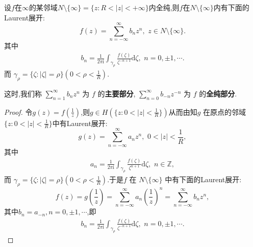 \documentclass[../../main.tex]{subfiles}%
\begin{document}
\begin{theorem}
设$f$在$\infty$的某邻域$N\setminus \{\infty\}=\{z:R<|z|<+\infty\}$内全纯,则\( f \)在$N\setminus \{\infty\}$内有下面的Laurent展开:
\[
f(z) = \sum_{n = -\infty}^{\infty} b_n z^n,\,\,z\in N\setminus \{\infty\}.
\]
其中
\begin{align*}
b_n=\frac{1}{2\pi \mathrm{i}}\int_{\gamma _{\rho}}{\frac{f(\zeta )}{\zeta^{-n+1}}\mathrm{d}\zeta},\,\,n=0,\pm 1,\cdots .
\end{align*}
而 \( \gamma_{\rho} = \{ \zeta: |\zeta| = \rho \} \)\( (0 < \rho <\frac{1}{R} )\).

这时,我们称 \( \sum_{n = 1}^{\infty} b_n z^n \) 为 \( f \) 的\textbf{主要部分}, \( \sum_{n = 0}^{\infty} b_{-n} z^{-n} \) 为 \( f \) 的\textbf{全纯部分}.
\end{theorem}
\begin{proof}

令$g\left( z \right) =f\left( \frac{1}{z} \right) $,则$g\in H(\{z:0<|z|<\frac{1}{R}\})$从而由知\( g \) 在原点的邻域$\{z:0<|z|<\frac{1}{R}\}$中有Laurent展开:
\[
g(z) = \sum_{n = -\infty}^{\infty} a_n z^n, \,\, 0 < |z| < \frac{1}{R},
\]
其中
\begin{align*}
a_n = \frac{1}{2\pi \mathrm{i}} \int_{\gamma_{\rho}} \frac{f(\zeta)}{\zeta^{n + 1}} \mathrm{d}\zeta,\,\,n\in \mathbb{Z},
\end{align*}
而 \( \gamma_{\rho} = \{ \zeta: |\zeta| = \rho \} \)\(( 0 < \rho < \frac{1}{R}) \).于是\( f \) 在 \( N\setminus \{\infty\}\) 中有下面的Laurent展开:
\[
f(z) =g\left( \frac{1}{z} \right) =\sum_{n = -\infty}^{\infty} a_n \left(\frac{1}{z}\right)^n= \sum_{n = -\infty}^{\infty} b_n z^n,
\]
其中\( b_n = a_{-n}, n = 0, \pm 1, \cdots \),即
\begin{align*}
b_n=\frac{1}{2\pi \mathrm{i}}\int_{\gamma _{\rho}}{\frac{f(\zeta )}{\zeta^{-n+1}}\mathrm{d}\zeta},\,\,n=0,\pm 1,\cdots .
\end{align*}

\end{proof}
\end{document}
